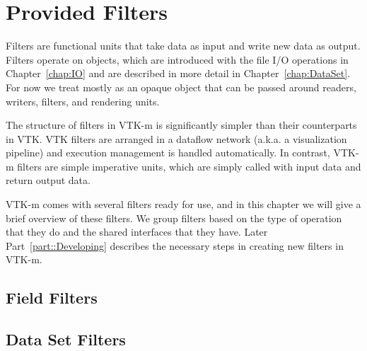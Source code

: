 
\chapter{Provided Filters}
\label{chap:ProvidedFilters}


Filters are functional units that take data as input and write new data as
output. Filters operate on  objects, which are introduced
with the file I/O operations in Chapter~\ref{chap:IO} and are described in
more detail in Chapter~\ref{chap:DataSet}. For now we treat
 mostly as an opaque object that can be passed
around readers, writers, filters, and rendering units.

\begin{didyouknow}
  The structure of filters in VTK-m is significantly simpler than their
  counterparts in VTK. VTK filters are arranged in a dataflow network
  (a.k.a. a visualization pipeline) and execution management is handled
  automatically. In contrast, VTK-m filters are simple imperative units,
  which are simply called with input data and return output data.
\end{didyouknow}

VTK-m comes with several filters ready for use, and in this chapter we will
give a brief overview of these filters. We group filters based on the type
of operation that they do and the shared interfaces that they have. Later
Part~\ref{part::Developing} describes the necessary steps in creating new
filters in VTK-m.


\section{Field Filters}




\section{Data Set Filters}



